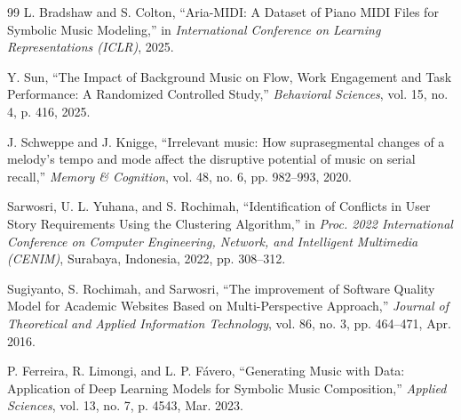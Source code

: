 \documentclass[conference,a4paper]{IEEEtran}
\begin{document}
\begin{thebibliography}{99}
L. Bradshaw and S. Colton, ``Aria-MIDI: A Dataset of Piano MIDI Files for Symbolic Music Modeling,'' in \textit{International Conference on Learning Representations (ICLR)}, 2025.

Y. Sun,
``The Impact of Background Music on Flow, Work Engagement and Task Performance: A Randomized Controlled Study,''
\textit{Behavioral Sciences}, vol. 15, no. 4, p. 416, 2025.

J. Schweppe and J. Knigge,
``Irrelevant music: How suprasegmental changes of a melody's tempo and mode affect the disruptive potential of music on serial recall,''
\textit{Memory \& Cognition}, vol. 48, no. 6, pp. 982--993, 2020.

Sarwosri, U. L. Yuhana, and S. Rochimah,
``Identification of Conflicts in User Story Requirements Using the Clustering Algorithm,''
in \textit{Proc. 2022 International Conference on Computer Engineering, Network, and Intelligent Multimedia (CENIM)},
Surabaya, Indonesia, 2022, pp. 308--312.

Sugiyanto, S. Rochimah, and Sarwosri,
``The improvement of Software Quality Model for Academic Websites Based on Multi-Perspective Approach,''
\textit{Journal of Theoretical and Applied Information Technology}, vol. 86, no. 3, pp. 464--471, Apr. 2016.

P. Ferreira, R. Limongi, and L. P. Fávero,
``Generating Music with Data: Application of Deep Learning Models for Symbolic Music Composition,''
\textit{Applied Sciences}, vol. 13, no. 7, p. 4543, Mar. 2023.

\end{thebibliography}
\end{document}
